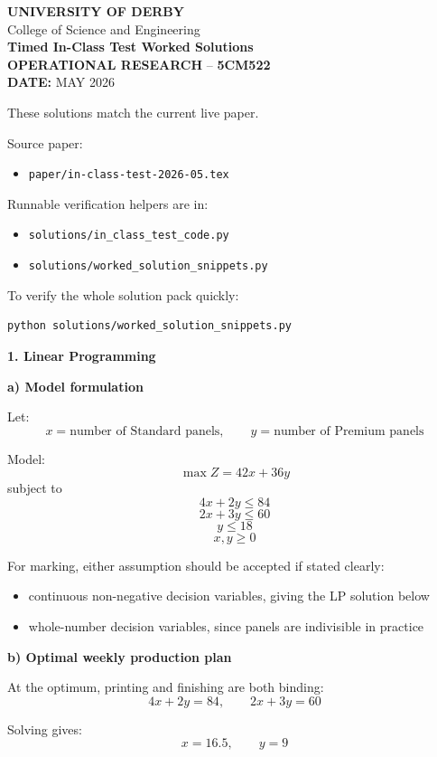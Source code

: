 \documentclass[11pt,a4paper]{article}
\newcommand{\universityname}{UNIVERSITY OF DERBY}
\newcommand{\college}{College of Science and Engineering}
\newcommand{\examtitle}{Timed In-Class Test Worked Solutions}
\newcommand{\moduletitle}{OPERATIONAL RESEARCH}
\newcommand{\modulecode}{5CM522}
\newcommand{\examdate}{MAY 2026}
\begin{document}
\begin{center}
{\large \textbf{\universityname}}\\
{\college}\\[0.4em]
{\Large \textbf{\examtitle}}\\
{\large \textbf{\moduletitle} -- \textbf{\modulecode}}\\[0.3em]
\textbf{DATE:} \examdate
\end{center}

These solutions match the current live paper.

Source paper:
\begin{itemize}
\item \texttt{paper/in-class-test-2026-05.tex}
\end{itemize}

Runnable verification helpers are in:
\begin{itemize}
\item \texttt{solutions/in\_class\_test\_code.py}
\item \texttt{solutions/worked\_solution\_snippets.py}
\end{itemize}

To verify the whole solution pack quickly:
\begin{verbatim}
python solutions/worked_solution_snippets.py
\end{verbatim}

\textbf{1. Linear Programming}

\textbf{a) Model formulation}

Let:
\[
x = \text{number of Standard panels}, \qquad y = \text{number of Premium panels}
\]

Model:
\[
\max Z = 42x + 36y
\]
subject to
\[
4x + 2y \le 84
\]
\[
2x + 3y \le 60
\]
\[
y \le 18
\]
\[
x, y \ge 0
\]

For marking, either assumption should be accepted if stated clearly:
\begin{itemize}
\item continuous non-negative decision variables, giving the LP solution below
\item whole-number decision variables, since panels are indivisible in practice
\end{itemize}

\textbf{b) Optimal weekly production plan}

At the optimum, printing and finishing are both binding:
\[
4x + 2y = 84, \qquad 2x + 3y = 60
\]

Solving gives:
\[
x = 16.5, \qquad y = 9
\]
\end{document}
